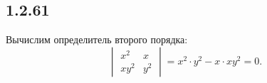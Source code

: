 \subsection{1.2.61}

Вычислим определитель второго порядка:
\[
\begin{vmatrix}
	x^2 & x \\
	xy^2 & y^2
\end{vmatrix}
=x^2\cdot y^2-x\cdot xy^2=0.
\]